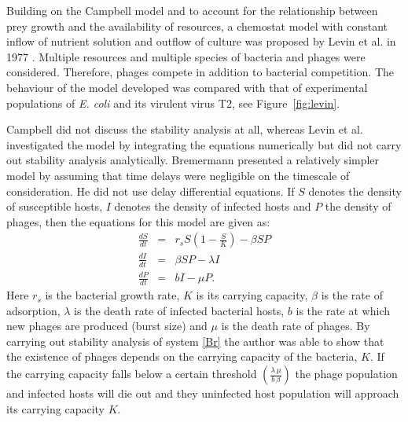 Building on the Campbell model and to account for the relationship between prey growth and the availability of resources, a chemostat model with constant inflow of nutrient solution and outflow of culture was proposed by Levin et al. in 1977 \cite{levin_resource-limited_1977}. Multiple resources and multiple species of bacteria and phages were considered. Therefore, phages compete in addition to bacterial competition. The behaviour of the model developed was compared with that of experimental populations of \textit{E. coli} and its virulent virus T2, see Figure~\ref{fig:levin}. 

Campbell did not discuss the stability analysis at all, whereas Levin et al. investigated the model by integrating the equations numerically but did not carry out stability analysis analytically. Bremermann \cite{bremermann_parasites_1983} presented a relatively simpler model by assuming that time delays were negligible on the timescale of consideration. He did not use delay differential equations. If  $S$ denotes the density of susceptible hosts, $I$ denotes the density of infected hosts and $P$ the density of phages, then the equations for this model are given as:
\begin{eqnarray}\label{Br}
\frac{dS}{dt} &=& r_s S \left(1- \frac{S}{K}\right) - \beta S P \nonumber\\
\frac{dI}{dt} &=& \beta S P - \lambda I \nonumber\\
\frac{dP}{dt} &=& b I - \mu P.
\end{eqnarray}
Here $r_s$ is the bacterial growth rate, $K$ is its carrying capacity, $\beta$ is the rate of adsorption, $\lambda$ is the death rate of infected bacterial hosts, $b$ is the rate at which new phages are produced (burst size) and $\mu$ is the death rate of phages.  By carrying out stability analysis of  system \ref{Br} the author was able to show that the existence of phages depends on the carrying capacity of the bacteria, $K$. If the carrying capacity falls below a certain threshold $\left( \frac{\lambda\, \mu}{b\, \beta}\right)$ the phage population and infected hosts will die out and they uninfected host population will approach its carrying capacity $K$.  

